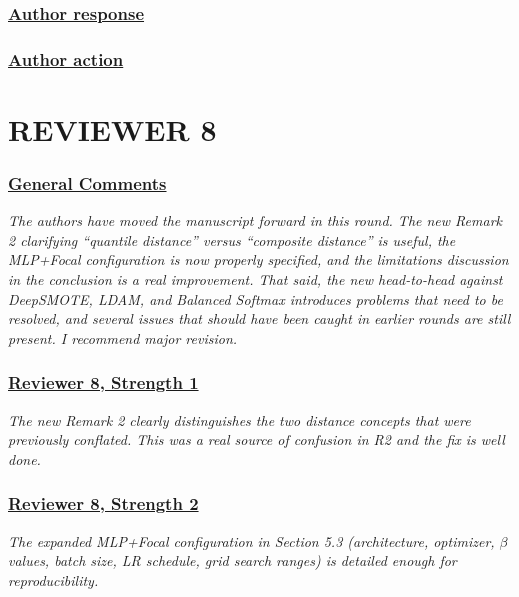 \documentclass[journal,12pt, onecolumn]{IEEEtran}
\begin{document}
{\color{black}
\subsubsection*{\textbf{\underline{Author response}}}
}

{\color{black}
\subsubsection*{\textbf{\underline{Author action}}}
}

\newpage


{\color{black}
\section*{\textbf{REVIEWER 8}}\label{rev8}}

{\color{black}
\subsubsection*{\underline{General Comments}}
\emph{The authors have moved the manuscript forward in this round. The new Remark 2 clarifying ``quantile distance'' versus ``composite distance'' is useful, the MLP+Focal configuration is now properly specified, and the limitations discussion in the conclusion is a real improvement. That said, the new head-to-head against DeepSMOTE, LDAM, and Balanced Softmax introduces problems that need to be resolved, and several issues that should have been caught in earlier rounds are still present. I recommend major revision.}
}


{\color{customgreen}
\subsubsection*{\underline{\textbf{Reviewer 8, Strength 1}}}
\emph{The new Remark 2 clearly distinguishes the two distance concepts that were previously conflated. This was a real source of confusion in R2 and the fix is well done.}
}


{\color{customgreen}
\subsubsection*{\underline{\textbf{Reviewer 8, Strength 2}}}
\emph{The expanded MLP+Focal configuration in Section 5.3 (architecture, optimizer, $\beta$ values, batch size, LR schedule, grid search ranges) is detailed enough for reproducibility.}
}
\end{document}
